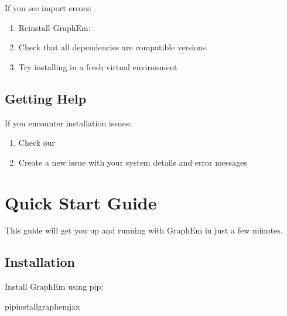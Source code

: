 \documentclass[letterpaper,10pt,english]{sphinxmanual}
\begin{document}
\sphinxAtStartPar
{}

\sphinxAtStartPar
If you see import errors:
\begin{enumerate}
%
\item {} 
\sphinxAtStartPar
Reinstall GraphEm: 

\item {} 
\sphinxAtStartPar
Check that all dependencies are compatible versions

\item {} 
\sphinxAtStartPar
Try installing in a fresh virtual environment

\end{enumerate}


\section{Getting Help}
\label{\detokenize{installation:getting-help}}
\sphinxAtStartPar
If you encounter installation issues:
\begin{enumerate}
%
\item {} 
\sphinxAtStartPar
Check our 

\item {} 
\sphinxAtStartPar
Create a new issue with your system details and error messages

\end{enumerate}

\sphinxstepscope


\chapter{Quick Start Guide}
\label{\detokenize{quickstart:quick-start-guide}}\label{\detokenize{quickstart::doc}}
\sphinxAtStartPar
This guide will get you up and running with GraphEm in just a few minutes.


\section{Installation}
\label{\detokenize{quickstart:installation}}
\sphinxAtStartPar
Install GraphEm using pip:

\begin{sphinxVerbatim}[commandchars=\\\{\}]
pipinstallgraphem\PYGZhy{}jax
\end{sphinxVerbatim}
\end{document}
